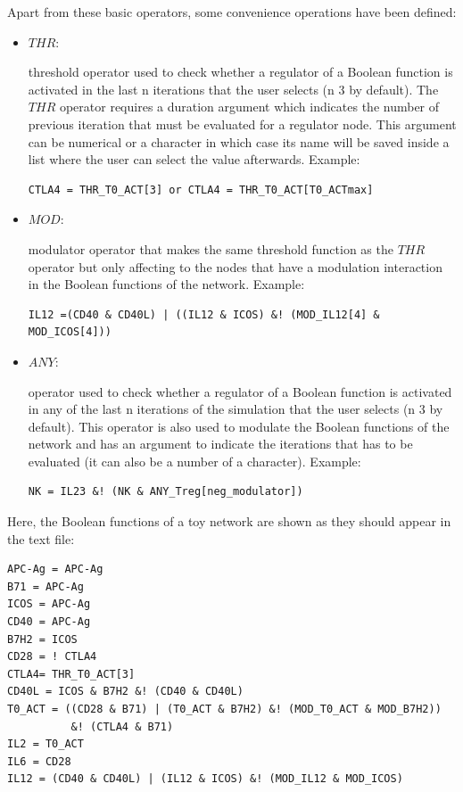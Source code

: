 \documentclass[a4paper]{article}
\begin{document}
Apart from these basic operators, some convenience operations have been defined:
\begin{itemize}

\item{$THR$:}{ threshold operator used to check whether a regulator of a Boolean function is activated in the last n iterations that the user selects (n 3 by default). The $THR$ operator requires a duration argument which indicates the number of previous iteration that must be evaluated for a regulator node. This argument can be numerical or a character in which case its name will be saved inside a list where the user can select the value afterwards. Example: 

\begin{verbatim}
CTLA4 = THR_T0_ACT[3] or CTLA4 = THR_T0_ACT[T0_ACTmax] 
 \end{verbatim}
}
 
\item{$MOD$:}{ modulator operator that makes the same threshold function as the $THR$ operator but only affecting to the nodes that have a modulation interaction in the Boolean functions of the network.
Example: 

\begin{verbatim}
IL12 =(CD40 & CD40L) | ((IL12 & ICOS) &! (MOD_IL12[4] & MOD_ICOS[4]))
 \end{verbatim}
}
 
\item{$ANY$:}{ operator used to check whether a regulator of a Boolean function is activated in any of the last n iterations of the simulation that the user selects (n 3 by default). This operator is also used to modulate the Boolean functions of the network and has an argument to indicate the iterations that has to be evaluated (it can also be a number of a character). Example:
\begin{verbatim}
NK = IL23 &! (NK & ANY_Treg[neg_modulator])
\end{verbatim}
}
\end{itemize}



Here, the Boolean functions of a toy network are shown as they should appear in the text file:
\begin{framed}
\begin{verbatim}
APC-Ag = APC-Ag
B71 = APC-Ag
ICOS = APC-Ag
CD40 = APC-Ag
B7H2 = ICOS
CD28 = ! CTLA4
CTLA4= THR_T0_ACT[3]
CD40L = ICOS & B7H2 &! (CD40 & CD40L)
T0_ACT = ((CD28 & B71) | (T0_ACT & B7H2) &! (MOD_T0_ACT & MOD_B7H2)) 
          &! (CTLA4 & B71)
IL2 = T0_ACT
IL6 = CD28
IL12 = (CD40 & CD40L) | (IL12 & ICOS) &! (MOD_IL12 & MOD_ICOS)
\end{verbatim}
\end{framed}
\end{document}
